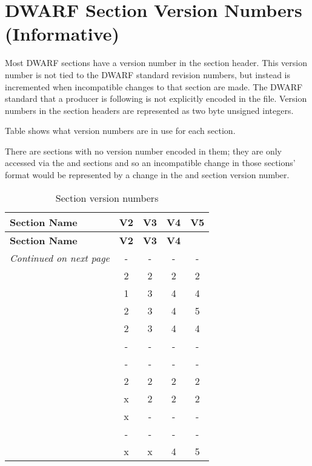 
\chapter[Section Version Numbers (Informative)]{DWARF Section Version Numbers (Informative)}
\label{app:dwarfsectionversionnumbersinformative}


Most DWARF sections have a version number in the section
header. This version number is not tied to the DWARF standard
revision numbers, but instead is incremented when incompatible
changes to that section are made. The DWARF standard that
a producer is following is not explicitly encoded in the
file. Version numbers in the section headers are represented
as two byte unsigned integers. 

Table 
shows what version
numbers are in use for each section.

There are sections with no version number encoded in them;
they are only accessed via the 
\dotdebuginfo{} and 
\dotdebugtypes{}
sections and so an incompatible change in those sections'
format would be represented by a change in the 
and \dotdebugtypes{} section version number.

\clearpage
\begin{centering}
\setlength{\extrarowheight}{0.1cm}
\begin{longtable}{lcccc}
  \caption{Section version numbers} \label{tab:sectionversionnumbers} \\
  \hline \bfseries Section Name &\bfseries V2 &\bfseries V3 &\bfseries V4 &\bfseries V5 \\ \hline
\endfirsthead
   \bfseries Section Name &\bfseries V2 &\bfseries V3 &\bfseries V4 \\ \hline
\endhead
  \hline \emph{Continued on next page}
\endfoot
  \hline
\endlastfoot
\dotdebugabbrev{}   & - & - & - & - \\
\dotdebugaranges{}  & 2 & 2 & 2 & 2 \\
\dotdebugframe{}    & 1 & 3 & 4 & 4 \\
\dotdebuginfo{}     & 2 & 3 & 4 & 5 \\
\dotdebugline{}     & 2 & 3 & 4 & 4 \\
\dotdebugloc{}      & - & - & - & - \\
\dotdebugmacinfo{}  & - & - & - & - \\
\dotdebugpubnames{} & 2 & 2 & 2 & 2 \\
\dotdebugpubtypes{} & x & 2 & 2 & 2 \\
\dotdebugranges{}   & x & - & - & - \\
\dotdebugstr{}      & - & - & - & - \\
\dotdebugtypes{}    & x & x & 4 & 5 \\
\end{longtable}
\end{centering}


